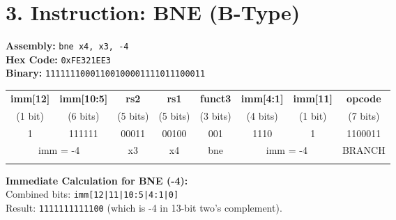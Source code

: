 \documentclass[12pt]{article}
\begin{document}
\vspace{1cm}

\section*{3. Instruction: BNE (B-Type)}
\textbf{Assembly:} \texttt{bne x4, x3, -4} \\
\textbf{Hex Code:} \texttt{0xFE321EE3} \\
\textbf{Binary:} \texttt{11111110001100100001111011100011}

\vspace{0.5cm}
\noindent
\begin{tabular}{|c|c|c|c|c|c|c|c|}
\hline
\textbf{imm[12]} & \textbf{imm[10:5]} & \textbf{rs2} & \textbf{rs1} & \textbf{funct3} & \textbf{imm[4:1]} & \textbf{imm[11]} & \textbf{opcode} \\
(1 bit) & (6 bits) & (5 bits) & (5 bits) & (3 bits) & (4 bits) & (1 bit) & (7 bits) \\
\hline
1 & 111111 & 00011 & 00100 & 001 & 1110 & 1 & 1100011 \\
\hline
\multicolumn{2}{|c|}{\multirow{2}{*}{imm = -4}} & x3 & x4 & bne & \multicolumn{2}{c|}{\multirow{2}{*}{imm = -4}} & BRANCH \\
\cline{3-5}\cline{8-8}
\multicolumn{2}{|c|}{} & \multicolumn{3}{c|}{} & \multicolumn{2}{c|}{} & \\
\hline
\end{tabular}

\vspace{0.5cm}
\textbf{Immediate Calculation for BNE (-4):} \\
Combined bits: \texttt{imm[12|11|10:5|4:1|0]} \\
Result: \texttt{1111111111100} (which is -4 in 13-bit two's complement).
\end{document}
